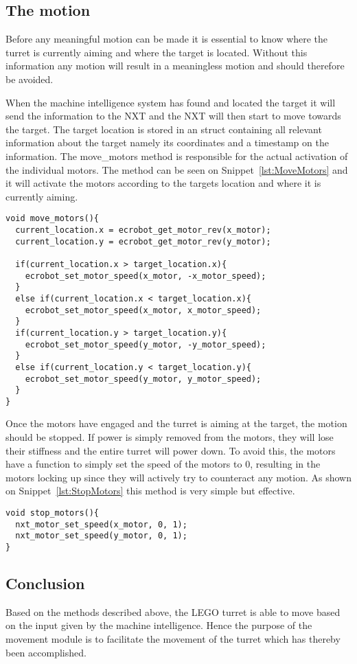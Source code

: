 \subsection{The motion}
Before any meaningful motion can be made it is essential to know where the turret is currently aiming and where the target is located.
Without this information any motion will result in a meaningless motion and should therefore be avoided.

When the machine intelligence system has found and located the target it will send the information to the NXT and the NXT will then start to move towards the target.
The target location is stored in an struct containing all relevant information about the target namely its coordinates and a timestamp on the information.
The move\_motors method is responsible for the actual activation of the individual motors.
The method can be seen on Snippet~\ref{lst:MoveMotors} and it will activate the motors according to the targets location and where it is currently aiming.
\begin{lstlisting}[language=CSharp,caption={move\_motors method from movement.c},label={lst:MoveMotors}]
void move_motors(){
  current_location.x = ecrobot_get_motor_rev(x_motor);
  current_location.y = ecrobot_get_motor_rev(y_motor);

  if(current_location.x > target_location.x){
    ecrobot_set_motor_speed(x_motor, -x_motor_speed);
  }
  else if(current_location.x < target_location.x){
    ecrobot_set_motor_speed(x_motor, x_motor_speed);
  }
  if(current_location.y > target_location.y){
    ecrobot_set_motor_speed(y_motor, -y_motor_speed);
  }
  else if(current_location.y < target_location.y){
    ecrobot_set_motor_speed(y_motor, y_motor_speed);
  }
}
\end{lstlisting}
Once the motors have engaged and the turret is aiming at the target, the motion should be stopped.
If power is simply removed from the motors, they will lose their stiffness and the entire turret will power down.
To avoid this, the motors have a function to simply set the speed of the motors to $0$, resulting in the motors locking up since they will actively try to counteract any motion.
As shown on Snippet~\ref{lst:StopMotors} this method is very simple but effective.
\begin{lstlisting}[language=CSharp,label={lst:StopMotors},caption={stop\_motors method from movement.c}]
void stop_motors(){
  nxt_motor_set_speed(x_motor, 0, 1);
  nxt_motor_set_speed(y_motor, 0, 1);
}
\end{lstlisting}

\subsection{Conclusion}
Based on the methods described above, the LEGO turret is able to move based on the input given by the machine intelligence.
Hence the purpose of the movement module is to facilitate the movement of the turret which has thereby been accomplished.
